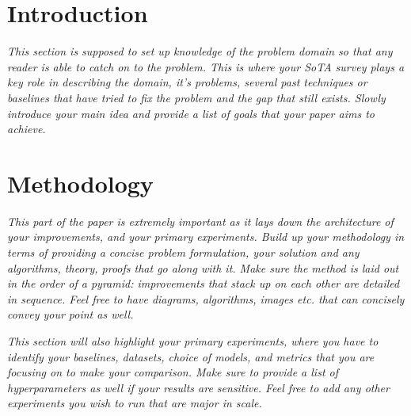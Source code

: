 \documentclass{article}
\begin{document}


\begin{abstract}
\textit{The purpose of an abstract is to summarize the entire paper in a nutshell. Provide information regarding the project domain, the current problem, your solution, and then quote your direct improvements against SoTA on key datasets. You can also summarize the main mechanism by which you are bringing about an improvement over the baseline.}
\end{abstract}

\section{Introduction}
\textit{This section is supposed to set up knowledge of the problem domain so that any reader is able to catch on to the problem. This is where your SoTA survey plays a key role in describing the domain, it's problems, several past techniques or baselines that have tried to fix the problem and the gap that still exists. Slowly introduce your main idea and provide a list of goals that your paper aims to achieve.}

\section{Methodology}
\textit{This part of the paper is extremely important as it lays down the architecture of your improvements, and your primary experiments. Build up your methodology in terms of providing a concise problem formulation, your solution and any algorithms, theory, proofs that go along with it. Make sure the method is laid out in the order of a pyramid: improvements that stack up on each other are detailed in sequence. Feel free to have diagrams, algorithms, images etc. that can concisely convey your point as well.}

\textit{This section will also highlight your primary experiments, where you have to identify your baselines, datasets, choice of models, and metrics that you are focusing on to make your comparison. Make sure to provide a list of hyperparameters as well if your results are sensitive. Feel free to add any other experiments you wish to run that are major in scale.}
\end{document}
